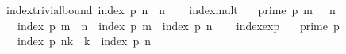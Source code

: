 \begin{isabellebody}
%
\endisatagproof
{\isafoldproof}%
%
\isadelimproof
\isanewline
%
\endisadelimproof
\isanewline
{}\isamarkupfalse%
\ index{\isacharunderscore}{\kern0pt}trivial{\isacharunderscore}{\kern0pt}bound{\isacharcolon}{\kern0pt}\ {\isachardoublequoteopen}index\ p\ n\ {\isasymle}\ n{\isachardoublequoteclose}\isanewline
%
\isadelimproof
\ \ %
\endisadelimproof
%
\isatagproof
{}\isamarkupfalse%
%
\endisatagproof
{\isafoldproof}%
%
\isadelimproof
\isanewline
%
\endisadelimproof
\isanewline
{}\isamarkupfalse%
\ index{\isacharunderscore}{\kern0pt}mult{\isacharcolon}{\kern0pt}\isanewline
\ \ \ {\isachardoublequoteopen}prime\ p{\isachardoublequoteclose}\ {\isachardoublequoteopen}m\ {\isachargreater}{\kern0pt}\ {}{\isachardoublequoteclose}\ {\isachardoublequoteopen}n\ {\isachargreater}{\kern0pt}\ {}{\isachardoublequoteclose}\isanewline
\ \ \ {\isachardoublequoteopen}index\ p\ {\isacharparenleft}{\kern0pt}m\ {\isacharasterisk}{\kern0pt}\ n{\isacharparenright}{\kern0pt}\ {\isacharequal}{\kern0pt}\ index\ p\ m\ {\isacharplus}{\kern0pt}\ index\ p\ n{\isachardoublequoteclose}\isanewline
%
\isadelimproof
\ \ %
\endisadelimproof
%
\isatagproof
{}\isamarkupfalse%
%
\endisatagproof
{\isafoldproof}%
%
\isadelimproof
\isanewline
%
\endisadelimproof
\isanewline
{}\isamarkupfalse%
\ index{\isacharunderscore}{\kern0pt}exp{\isacharcolon}{\kern0pt}\isanewline
\ \ \ {\isachardoublequoteopen}prime\ p{\isachardoublequoteclose}\isanewline
\ \ \ {\isachardoublequoteopen}index\ p\ {\isacharparenleft}{\kern0pt}n{\isacharcircum}{\kern0pt}k{\isacharparenright}{\kern0pt}\ {\isacharequal}{\kern0pt}\ k\ {\isacharasterisk}{\kern0pt}\ index\ p\ n{\isachardoublequoteclose}\isanewline
%
\isadelimproof
\ \ %
\endisadelimproof
%
\isatagproof
{}\isamarkupfalse%
%
\endisatagproof
{\isafoldproof}%
%
\isadelimproof
\isanewline
%
\endisadelimproof
%
\isadelimtheory
\isanewline
%
\endisadelimtheory
%
\isatagtheory
{}\isamarkupfalse%
%
\endisatagtheory
{\isafoldtheory}%
%
\isadelimtheory
%
\endisadelimtheory
%
\end{isabellebody}%
\endinput
